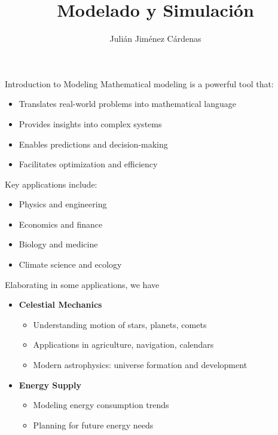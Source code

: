 \documentclass[xcolor=svgnames, t]{beamer}
\title[Modelado y Simulación]{Modelado y Simulación}
\institute[]{Facultad de Matemáticas \\ FUKL}
\author[Julián Jiménez Cárdenas]{
Julián Jiménez Cárdenas}
\institute[]{Facultad de Matemáticas \\ FUKL}
\theoremstyle{definition}
\theoremstyle{plain}
\theoremstyle{remark}
\begin{document}
\begin{frame}
\maketitle
\end{frame}






\begin{frame}[allowframebreaks]{Introduction to Modeling}
	Mathematical modeling is a powerful tool that:

\begin{itemize}
    \item Translates real-world problems into mathematical language
    \item Provides insights into complex systems
    \item Enables predictions and decision-making
    \item Facilitates optimization and efficiency
\end{itemize}

\vspace{0.5cm}

Key applications include:
\begin{itemize}
    \item Physics and engineering
    \item Economics and finance
    \item Biology and medicine
    \item Climate science and ecology
\end{itemize}

Elaborating in some applications, we have
\begin{itemize}
    \item \textbf{Celestial Mechanics}
    \begin{itemize}
        \item Understanding motion of stars, planets, comets
        \item Applications in agriculture, navigation, calendars
        \item Modern astrophysics: universe formation and development
    \end{itemize}
    
    \item \textbf{Energy Supply}
    \begin{itemize}
        \item Modeling energy consumption trends
        \item Planning for future energy needs
    \end{itemize}
    

\end{itemize}
\end{frame}
\end{document}
